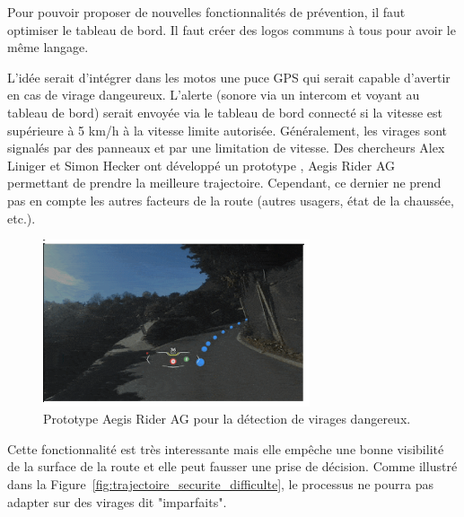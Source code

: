 Pour pouvoir proposer de nouvelles fonctionnalités de prévention, il faut optimiser le tableau de bord. Il faut créer des logos communs à tous pour avoir le même langage. 

L'idée serait d'intégrer dans les motos une puce GPS qui serait capable d'avertir en cas de virage dangeureux. L'alerte (sonore via un intercom et voyant au tableau de bord) serait envoyée via le tableau de bord connecté si la vitesse est supérieure à 5 km/h à la vitesse limite autorisée. Généralement, les virages sont signalés par des panneaux et par une limitation de vitesse. Des chercheurs Alex Liniger et Simon Hecker ont développé un prototype , Aegis Rider AG\cite{vitesse_virage_mcnews} permettant de prendre la meilleure trajectoire. Cependant, ce dernier ne prend pas en compte les autres facteurs de la route (autres usagers, état de la chaussée, etc.). 

\begin{figure}[h]
    \centering
    \includegraphics[width=0.7\textwidth]{coeur_memoire/images/aegis.png} 
    \caption{Prototype Aegis Rider AG pour la détection de virages dangereux.}
\end{figure}
Cette fonctionnalité est très interessante mais elle empêche une bonne visibilité de la surface de la route et elle peut fausser une prise de décision.
Comme illustré dans la Figure~\ref{fig:trajectoire_securite_difficulte}, le processus ne pourra pas adapter sur des virages dit "imparfaits".






